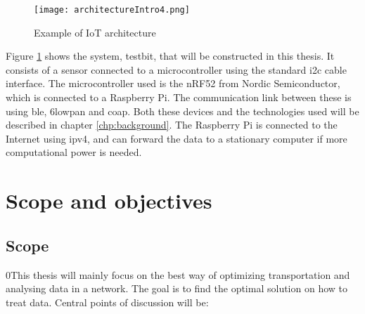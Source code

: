 \begin{figure}[ht]
    \centering
    \texttt{[image: architectureIntro4.png]}    
    \caption{Example of IoT architecture}
    \label{iotExampleArchitecture}
\end{figure}

\noindent Figure \ref{iotExampleArchitecture} shows the system, testbit, that will be constructed in this thesis. It consists of a sensor connected to a \gls{microcontroller} using the standard \gls{i2c} cable interface. The \gls{microcontroller} used is the \gls{nRF52} from Nordic Semiconductor, which is connected to a \gls{Raspberry Pi}. The communication link between these is using \gls{ble}, \gls{6lowpan} and \gls{coap}. Both these devices and the technologies used will be described in chapter \ref{chp:background}. The \gls{Raspberry Pi} is connected to the Internet using \gls{ipv4}, and can forward the data to a stationary computer if more computational power is needed. 












\section{Scope and objectives}

\subsection{Scope}

0\noindent This thesis will mainly focus on the best way of optimizing transportation and analysing data in a network. The goal is to find the optimal solution on how to treat data. Central points of discussion will be:

